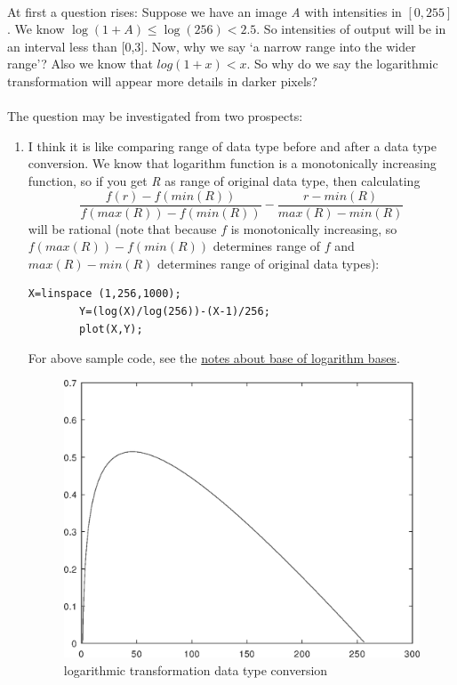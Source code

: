 \paragraph{}At first a question rises: Suppose we have an image \emph{A} with
intensities in $[0,255]$. We know $\log(1+A) \leq  \log(256) < 2.5$. So
intensities of output will be in an interval less than [0,3]. Now, why we say `a
narrow range into the wider range'? Also we know that $log(1+x) < x$. So why do
we say the logarithmic transformation will appear more details in darker pixels?

\paragraph{}The question may be investigated from two prospects:
\begin{enumerate}
    \item I think it is like comparing range of data type before and after a
    data type conversion. We know that logarithm function 
    is a monotonically increasing function, so if you get \emph{R} as range of
    original data type, then calculating 
    \begin{equation*}
        \frac{f(r) - f(min(R))}{f(max(R))-f(min(R))} - \frac{r -
        min(R)}{max(R)-min(R)}  \tag{*}
    \end{equation*}\label{relation:eq_1} 
    will be rational (note that because $f$ is monotonically increasing, so $f(max(R))-f(min(R))$ determines range of $f$ and 
    $max(R)-min(R)$ determines range of original data types):
    \begin{Verbatim}[frame=single,label=Octave lab:\ logarithmic-data-type-conversion]
        X=linspace (1,256,1000);
        Y=(log(X)/log(256))-(X-1)/256;
        plot(X,Y);   
    \end{Verbatim}
    For above sample code, see the \hyperref[note:note_about_log_base]{notes
    about base of logarithm bases}.
    \begin{figure}[htb!]
        \includegraphics[scale=0.4]{logarithmic_transformation_data_type_conversion.eps}
        \centering
        \caption{logarithmic transformation data type conversion}
        \label{fig:logarithmic_transformation_data_type_conversion}
    \end{figure}
    

\end{enumerate}

